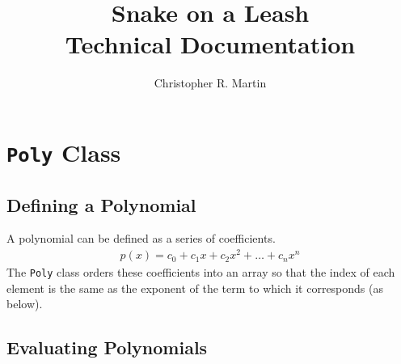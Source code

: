 \documentclass[letterpaper]{article}
\title{Snake on a Leash\\Technical Documentation}
\author{Christopher R. Martin}
\begin{document}
\section{\verb`Poly` Class}
\subsection{Defining a Polynomial}
A polynomial can be defined as a series of coefficients.  
\begin{align}
p(x) = c_0 + c_1 x + c_2 x^2 + \ldots + c_n x^n
\end{align}
The \verb`Poly` class orders these coefficients into an array so that the index of each element is the same as the exponent of the term to which it corresponds (as below).

\subsection{Evaluating Polynomials}
\end{document}
